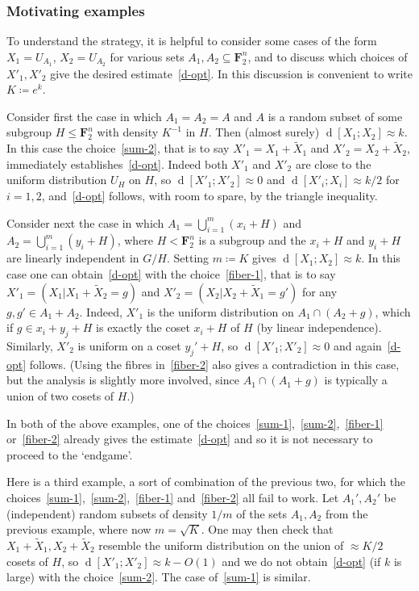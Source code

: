 \documentclass[12pt,reqno,tbtags]{amsart}
\theoremstyle{definition}
\theoremstyle{remark}
\renewcommand{\leq}{\leqslant}
\renewcommand{\le}{\leq}
\def\F{\mathbf{F}}
\newcommand{\dist}[2]{{\operatorname{d}[#1;#2]}} %
\numberwithin{equation}{section}
\begin{document}
\subsubsection*{Motivating examples}
To understand the strategy, it is helpful to consider some cases of the form $X_1 = U_{A_1}$, $X_2 = U_{A_2}$ for various sets $A_1,A_2 \subseteq \F_2^n$, and to discuss which choices of $X'_1, X'_2$ give the desired estimate~\eqref{d-opt}. In this discussion is convenient to write $K \coloneqq e^k$.

Consider first the case in which $A_1=A_2=A$ and $A$ is a random subset of some subgroup $H \le \F_2^n$ with density $K^{-1}$ in $H$.
Then (almost surely) $\dist{X_1}{X_2} \approx k$.
In this case the choice~\eqref{sum-2}, that is to say $X'_1 = X_1 + \tilde X_1$ and $X'_2 = X_2 + \tilde X_2$, immediately establishes~\eqref{d-opt}. Indeed both $X'_1$ and $X'_2$ are close to the uniform distribution $U_H$ on $H$, so $\dist{X'_1}{X'_2} \approx 0$ and $\dist{X'_i}{X_i}\approx k/2$ for $i=1,2$, and~\eqref{d-opt} follows, with room to spare, by the triangle inequality.

Consider next the case in which $A_1 = \bigcup_{i = 1}^{m} (x_i + H)$ and $A_2 = \bigcup_{i=1}^m (y_i+ H)$, where $H < \F_2^n$ is a subgroup and the $x_i+H$ and $y_i+H$ are linearly independent in $G/H$. Setting $m \coloneqq K$ gives $\dist{X_1}{X_2} \approx k$.
In this case one can obtain~\eqref{d-opt} with the choice~\eqref{fiber-1}, that is to say $X'_1 = (X_1 | X_1 + \tilde X_2 = g)$ and $X'_2 = (X_2 | X_2 + \tilde X_1 = g')$ for any $g,g' \in A_1+A_2$.
Indeed, $X'_1$ is the uniform distribution on $A_1 \cap (A_2 + g)$, which if $g \in x_i+y_j+H$ is exactly the coset $x_i+H$ of $H$ (by linear independence). Similarly, $X'_2$ is uniform on a coset $y_j'+H$, so $\dist{X'_1}{X'_2} \approx 0$ and again~\eqref{d-opt} follows.
(Using the fibres in~\eqref{fiber-2} also gives a contradiction in this case, but the analysis is slightly more involved, since $A_1 \cap (A_1 + g)$ is typically a union of two cosets of $H$.)

In both of the above examples, one of the choices~\eqref{sum-1},~\eqref{sum-2},~\eqref{fiber-1} or~\eqref{fiber-2} already gives the estimate~\eqref{d-opt} and so it is not necessary to proceed to the `endgame'.

Here is a third example, a sort of combination of the previous two, for which the choices~\eqref{sum-1},~\eqref{sum-2},~\eqref{fiber-1} and~\eqref{fiber-2} all fail to work.
Let $A_1',A_2'$ be (independent) random subsets of density $1/m$ of the sets $A_1,A_2$ from the previous example, where now $m = \sqrt{K}$.
One may then check that $X_1 + \tilde X_1, X_2 + \tilde X_2$ resemble the uniform distribution on the union of $\approx K/2$ cosets of $H$, so $\dist{X'_1}{X'_2} \approx k - O(1)$ and we do not obtain~\eqref{d-opt} (if $k$ is large) with the choice~\eqref{sum-2}. The case of~\eqref{sum-1} is similar.
\end{document}
